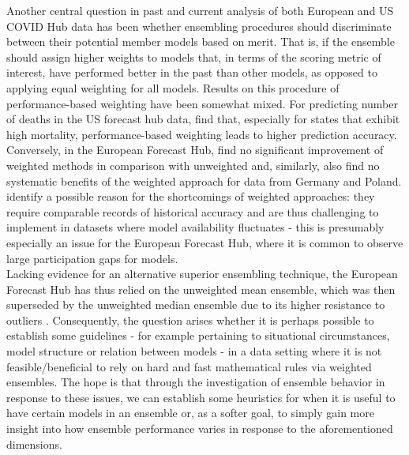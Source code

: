 Another central question in past and current analysis of both European and US COVID Hub data has been whether ensembling procedures should discriminate between their potential member models based on merit. That is, if the ensemble should assign higher weights to models that, in terms of the scoring metric of interest, have performed better in the past than other models, as opposed to applying equal weighting for all models. Results on this procedure of performance-based weighting have been somewhat mixed. For predicting number of deaths in the US forecast hub data, \cite{taylor_combining_2021} find that, especially for states that exhibit high mortality, performance-based weighting leads to higher prediction accuracy.  Conversely, in the European Forecast Hub, \cite{sherratt_draft_nodate} find no significant improvement of weighted methods in comparison with unweighted and, similarly, \cite{bracher_pre-registered_2021} also find no systematic benefits of the weighted approach for data from Germany and Poland. \cite{taylor_combining_2021} identify a possible reason for the shortcomings of weighted approaches: they require comparable records of historical accuracy and are thus challenging to implement in datasets where model availability fluctuates - this is presumably especially an issue for the European Forecast Hub, where it is common to observe large participation gaps for models. \\ 
Lacking evidence for an alternative superior ensembling technique, the European Forecast Hub has thus relied on the unweighted mean ensemble, which was then superseded by the unweighted median ensemble due to its higher resistance to outliers \citep{sherratt_draft_nodate}. Consequently, the question arises whether it is perhaps possible %
to establish some guidelines - for example pertaining to situational circumstances, model structure or relation between models - in a data setting where it is not feasible/beneficial to rely on hard and fast mathematical rules via weighted ensembles. %
The hope is that through the investigation of ensemble behavior in response to these issues, we can establish some heuristics for when it is useful to have certain models in an ensemble or, as a softer goal, to simply gain more insight into how ensemble performance varies in response to the aforementioned dimensions.\\ 

